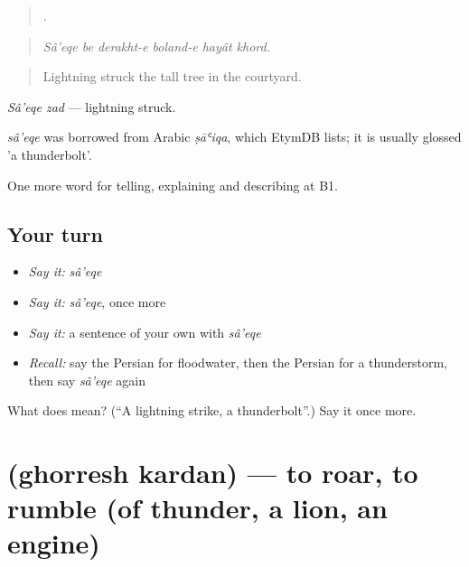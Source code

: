 \begin{quote}
     .
\end{quote}

\begin{quote}
\emph{Sâ'eqe be derakht-e boland-e hayât khord.}
\end{quote}

\begin{quote}
Lightning struck the tall tree in the courtyard.
\end{quote}

\emph{Sâ'eqe zad} — lightning struck.

\begin{cousinweb}
\emph{sâ'eqe} was borrowed from Arabic \emph{ṣāʿiqa}, which EtymDB lists; it is usually glossed 'a thunderbolt'.
\end{cousinweb}

\begin{grammarlens}[title={What you've built}]
One more word for telling, explaining and describing at B1.
\end{grammarlens}

\subsection*{Your turn}
\begin{itemize}
\raggedright
  \item \emph{Say it:} \emph{sâ'eqe}
  \item \emph{Say it:} \emph{sâ'eqe}, once more
  \item \emph{Say it:} a sentence of your own with \emph{sâ'eqe}
  \item \emph{Recall:} say the Persian for floodwater, then the Persian for a thunderstorm, then say \emph{sâ'eqe} again
\end{itemize}

\begin{tcolorbox}[breakable,colback=teal!4,colframe=teal!35!black,title={Before you move on}]
What does  mean? (\textquotedblleft{}A lightning strike, a thunderbolt\textquotedblright{}.) Say it once more.
\end{tcolorbox}
\section[\texorpdfstring{\fa{غرش} \fa{کردن} (ghorresh kardan)}{غرش کردن (ghorresh kardan)}]{  (ghorresh kardan) — to roar, to rumble (of thunder, a lion, an engine)}

